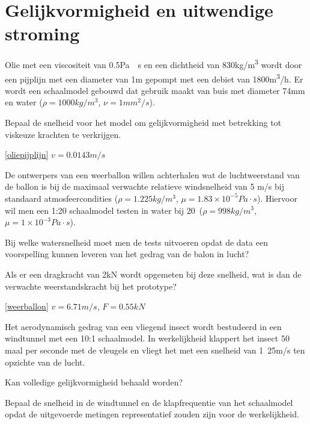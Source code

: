 \chapter{Gelijkvormigheid en uitwendige stroming}
\label{sec:Gelijkvormigheid en uitwendige stroming}
\begin{toepassing}
	\label{oliepijplijn}
Olie met een viscositeit van 0.5\unit{Pa \cdot s} en een dichtheid van 830\unit{kg/m^3} wordt door een pijplijn met een diameter van 1m gepompt met een debiet van 1800\unit{m^3/h}. Er wordt een schaalmodel gebouwd dat gebruik maakt van buis met diameter 74mm en water ($\rho = 1000\unit{kg/m^3}$, $\nu = 1\unit{mm^2/s}$).

Bepaal de snelheid voor het model om gelijkvormigheid met betrekking tot viskeuze krachten te verkrijgen.

\end{toepassing}
\begin{antwoord}{\ref{oliepijplijn}}
	$v = 0.0143\unit{m/s}$
\end{antwoord}
\begin{toepassing}[*]
	\label{weerballon}
De ontwerpers van een weerballon willen achterhalen wat de luchtweerstand van de ballon is bij de maximaal verwachte relatieve windsnelheid van 5 m/s bij standaard atmosfeercondities ($\rho = 1.225\unit{kg/m^3}$, $\mu = 1.83\times 10^{-5}\unit{Pa \cdot s}$).
Hiervoor wil men een 1:20 schaalmodel testen in water bij 20\degC\ ($\rho = 998\unit{kg/m^3}$, $\mu = 1\times 10^{-3}\unit{Pa \cdot s}$). 
		
Bij welke watersnelheid moet men de tests uitvoeren opdat de data een voorspelling kunnen leveren van het gedrag van de balon in lucht? 
		
Als er een dragkracht van 2\unit{kN} wordt opgemeten bij deze snelheid, wat is dan de verwachte weerstandskracht bij het prototype?
\end{toepassing}
\begin{antwoord}{\ref{weerballon}}
	$v = 6.71\unit{m/s}$, $F = 0.55\unit{kN}$
\end{antwoord}
\begin{toepassing}[*]
	\label{insect}
Het aerodynamisch gedrag van een vliegend insect wordt bestudeerd in een windtunnel met een 10:1 schaalmodel. In werkelijkheid klappert het insect 50 maal per seconde met de vleugels en vliegt het met een snelheid van \unit{1.25}{m/s} ten opzichte van de lucht. 
		
Kan volledige gelijkvormigheid behaald worden?
		
Bepaal de snelheid in de windtunnel en de klapfrequentie van het schaalmodel opdat de uitgevoerde metingen representatief zouden zijn voor de werkelijkheid.
\end{toepassing}
